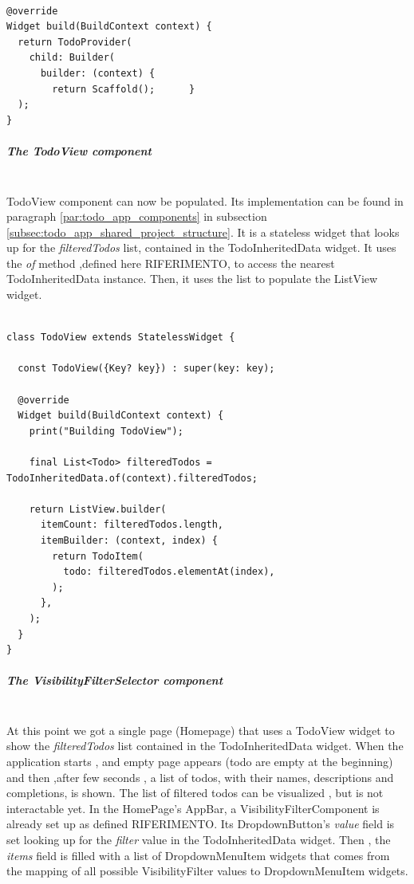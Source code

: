 \begin{verbatim}

@override
Widget build(BuildContext context) {
  return TodoProvider(
    child: Builder(
      builder: (context) {
        return Scaffold();      }
  );
}
\end{verbatim}

\subparagraph{The TodoView component}\mbox{}\\
\label{subpar:todo_app_inherited_widget_todoview_component}
TodoView component can now be populated. Its implementation can be found in paragraph \ref{par:todo_app_components} in subsection \ref{subsec:todo_app_shared_project_structure}. It is a stateless widget that looks up for the \textit{filteredTodos} list, contained in the TodoInheritedData widget. It uses the \textit{of} method ,defined here RIFERIMENTO, to access the nearest TodoInheritedData instance. Then, it uses the list to populate the ListView widget. 
\mbox{}\\


 \mbox{}

\begin{verbatim}

class TodoView extends StatelessWidget {

  const TodoView({Key? key}) : super(key: key);

  @override
  Widget build(BuildContext context) {
    print("Building TodoView");

    final List<Todo> filteredTodos = TodoInheritedData.of(context).filteredTodos;

    return ListView.builder(
      itemCount: filteredTodos.length,
      itemBuilder: (context, index) {
        return TodoItem(
          todo: filteredTodos.elementAt(index),
        );
      },
    );
  }
}
\end{verbatim}


\subparagraph{The VisibilityFilterSelector component}\mbox{}\\
\label{subpar:todo_app_inherited_widget_visibilityfiltercomponent_component}
At this point we got a single page (Homepage) that uses a TodoView widget to show the \textit{filteredTodos} list contained in the TodoInheritedData widget. When the application starts , and empty page appears (todo are empty at the beginning) and then ,after few seconds , a list of todos, with their names, descriptions and completions, is shown. The list of filtered todos can be visualized , but is not interactable yet. 
In the HomePage’s AppBar, a VisibilityFilterComponent is already set up as defined RIFERIMENTO. Its DropdownButton’s \textit{value} field is set looking up for the \textit{filter} value in the TodoInheritedData widget. Then , the \textit{items} field is filled with a list of DropdownMenuItem widgets that comes from the mapping of all possible VisibilityFilter values to DropdownMenuItem widgets.
\mbox{}\\



